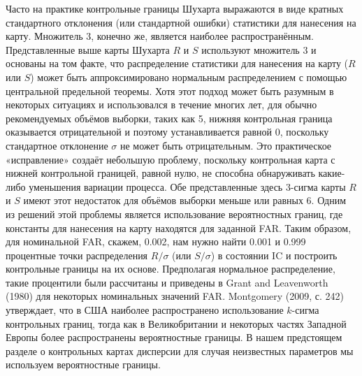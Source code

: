Часто на практике контрольные границы Шухарта выражаются в виде кратных стандартного отклонения (или стандартной ошибки) статистики для нанесения на карту. Множитель 3, конечно же, является наиболее распространённым. Представленные выше карты Шухарта \(R\) и \(S\) используют множитель 3 и основаны на том факте, что распределение статистики для нанесения на карту (\(R\) или \(S\)) может быть аппроксимировано нормальным распределением с помощью центральной предельной теоремы. Хотя этот подход может быть разумным в некоторых ситуациях и использовался в течение многих лет, для обычно рекомендуемых объёмов выборки, таких как 5, нижняя контрольная граница оказывается отрицательной и поэтому устанавливается равной 0, поскольку стандартное отклонение \(\sigma\) не может быть отрицательным. Это практическое «исправление» создаёт небольшую проблему, поскольку контрольная карта с нижней контрольной границей, равной нулю, не способна обнаруживать какие-либо уменьшения вариации процесса. Обе представленные здесь 3-сигма карты \(R\) и \(S\) имеют этот недостаток для объёмов выборки меньше или равных 6. Одним из решений этой проблемы является использование вероятностных границ, где константы для нанесения на карту находятся для заданной FAR. Таким образом, для номинальной FAR, скажем, 0.002, нам нужно найти 0.001 и 0.999 процентные точки распределения \(R/\sigma\) (или \(S/\sigma\)) в состоянии IC и построить контрольные границы на их основе. Предполагая нормальное распределение, такие процентили были рассчитаны и приведены в Grant and Leavenworth (1980) для некоторых номинальных значений FAR. Montgomery (2009, с. 242) утверждает, что в США наиболее распространено использование \(k\)-сигма контрольных границ, тогда как в Великобритании и некоторых частях Западной Европы более распространены вероятностные границы. В нашем предстоящем разделе о контрольных картах дисперсии для случая неизвестных параметров мы используем вероятностные границы.

